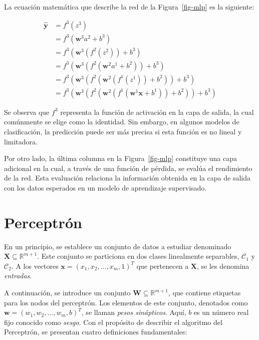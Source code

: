 \documentclass[
  us-letterpaper,
]{scrreprt}
\theoremstyle{plain}
\theoremstyle{definition}
\theoremstyle{plain}
\theoremstyle{definition}
\theoremstyle{remark}
\begin{document}
La ecuación matemática que describe la red de la Figura~\ref{fig-mlp} es
la siguiente:

\[
\begin{split}\hat{\mathbf{y}} &= f^3(z^3) \\&= f^3(\mathbf{w}^3 a^2 + b^3) \\&= f^3(\mathbf{w}^3 (f^2(z^2)) + b^3) \\&= f^3(\mathbf{w}^3 (f^2(\mathbf{w}^2 a^1 + b^2)) + b^3) \\&= f^3(\mathbf{w}^3 (f^2(\mathbf{w}^2 (f^1(z^1)) + b^2)) + b^3) \\&= f^3(\mathbf{w}^3 (f^2(\mathbf{w}^2 (f^1(\mathbf{w}^1 \mathbf{x} + b^1)) + b^2)) + b^3)\end{split}
\]

Se observa que \(f^3\) representa la función de activación en la capa de
salida, la cual comúnmente se elige como la identidad. Sin embargo, en
algunos modelos de clasificación, la predicción puede ser más precisa si
esta función es no lineal y limitadora.

Por otro lado, la última columna en la Figura~\ref{fig-mlp} constituye
una capa adicional en la cual, a través de una función de pérdida, se
evalúa el rendimiento de la red. Esta evaluación relaciona la
información obtenida en la capa de salida con los datos esperados en un
modelo de aprendizaje supervisado.

\section{Perceptrón}\label{perceptruxf3n}

En un principio, se establece un conjunto de datos a estudiar denominado
\(\mathbf X \subseteq \mathbb R^{m+1}\). Este conjunto se particiona en
dos clases linealmente separables, \(\mathscr C_1\) y \(\mathscr C_2\).
A los vectores \(\mathbf x = (x_1, x_2,...,x_m,1)^T\) que pertenecen a
\(\mathbf X\), se les denomina \emph{entradas}.

A continuación, se introduce un conjunto
\(\mathbf W \subseteq \mathbb R^{m+1}\), que contiene etiquetas para los
nodos del perceptrón. Los elementos de este conjunto, denotados como
\(\mathbf w = (w_1,w_2,...,w_m,b)^T\), se llaman \emph{pesos
sinápticos}. Aquí, \(b\) es un número real fijo conocido como
\emph{sesgo}. Con el propósito de describir el algoritmo del Perceptrón,
se presentan cuatro definiciones fundamentales:
\end{document}
